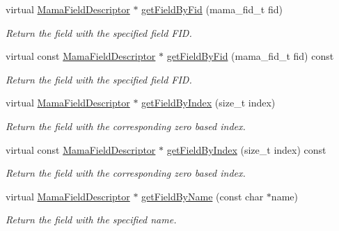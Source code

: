 \begin{DoxyCompactItemize}
virtual \hyperlink{classWombat_1_1MamaFieldDescriptor}{MamaFieldDescriptor} $\ast$ \hyperlink{classWombat_1_1MamaDictionary_ada3a8fa9ff039d223d83f5c8396d9b50}{getFieldByFid} (mama\_\-fid\_\-t fid)
\begin{DoxyCompactList}\small\item\em Return the field with the specified field FID. \item\end{DoxyCompactList}\item 
virtual const \hyperlink{classWombat_1_1MamaFieldDescriptor}{MamaFieldDescriptor} $\ast$ \hyperlink{classWombat_1_1MamaDictionary_a898677c535dfee775b342651fc898e02}{getFieldByFid} (mama\_\-fid\_\-t fid) const 
\begin{DoxyCompactList}\small\item\em Return the field with the specified field FID. \item\end{DoxyCompactList}\item 
virtual \hyperlink{classWombat_1_1MamaFieldDescriptor}{MamaFieldDescriptor} $\ast$ \hyperlink{classWombat_1_1MamaDictionary_a08eacabaf6e6d36f7f504508f0553813}{getFieldByIndex} (size\_\-t index)
\begin{DoxyCompactList}\small\item\em Return the field with the corresponding zero based index. \item\end{DoxyCompactList}\item 
virtual const \hyperlink{classWombat_1_1MamaFieldDescriptor}{MamaFieldDescriptor} $\ast$ \hyperlink{classWombat_1_1MamaDictionary_a8790a6366d31dcfa964be65ec84d4ed1}{getFieldByIndex} (size\_\-t index) const 
\begin{DoxyCompactList}\small\item\em Return the field with the corresponding zero based index. \item\end{DoxyCompactList}\item 
virtual \hyperlink{classWombat_1_1MamaFieldDescriptor}{MamaFieldDescriptor} $\ast$ \hyperlink{classWombat_1_1MamaDictionary_a3b99774008d6b4d7e36832a34ef7f8d8}{getFieldByName} (const char $\ast$name)
\begin{DoxyCompactList}\small\item\em Return the field with the specified name. \item\end{DoxyCompactList}\item 

\end{DoxyCompactItemize}
